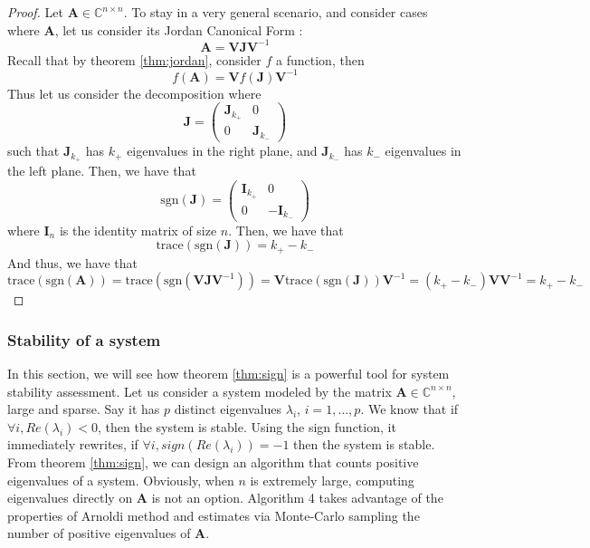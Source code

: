 \documentclass[11pt]{article}
\numberwithin{equation}{section}
\begin{document}
\begin{proof}
    Let $\mathbf{A}\in\mathbb{C}^{n\times n}$. To stay in a very general scenario, and consider cases where $\mathbf{A}$, let us consider its Jordan Canonical Form :
    \begin{equation*}
        \mathbf{A} = \mathbf{VJV}^{-1}
    \end{equation*} 
    Recall that by theorem \ref{thm:jordan}, consider $f$ a function, then 
    \begin{equation*}
        f(\mathbf{A}) = \mathbf{V}f(\mathbf{J})\mathbf{V}^{-1}
    \end{equation*}
    Thus let us consider the decomposition where 
    \begin{equation*}
        \mathbf{J} = \begin{pmatrix}
            \mathbf{J}_{k_+} & 0 \\ 0 & \mathbf{J}_{k_-}
        \end{pmatrix}
    \end{equation*}
    such that $\mathbf{J}_{k_+}$ has $k_+$ eigenvalues in the right plane, and $\mathbf{J}_{k_-}$ has $k_-$ eigenvalues in the left plane. Then, we have that
    \begin{equation*}
        \text{sgn}(\mathbf{J}) = \begin{pmatrix}
            \mathbf{I}_{k_+} & 0 \\ 0 & -\mathbf{I}_{k_-}
        \end{pmatrix}
    \end{equation*}
    where $\mathbf{I}_n$ is the identity matrix of size $n$. Then, we have that
    \begin{equation*}
        \text{trace}(\text{sgn}(\mathbf{J})) = k_+ - k_-
    \end{equation*}
    And thus, we have that
    \begin{equation*}
        \text{trace}(\text{sgn}(\mathbf{A})) = \text{trace}(\text{sgn}(\mathbf{VJV}^{-1})) = \mathbf{V}\text{trace}(\text{sgn}(\mathbf{J}))\mathbf{V}^{-1} = (k_+-k_-)\mathbf{V}\mathbf{V}^{-1} = k_+ - k_-
    \end{equation*}
\end{proof}
\subsubsection{Stability of a system}
In this section, we will see how theorem \ref{thm:sign} is a powerful tool for system stability assessment. Let us consider a system modeled by the matrix $\mathbf{A}\in\mathbb{C}^{n\times n}$, large and sparse. Say it has $p$ distinct eigenvalues $\lambda_i$, $i=1,\dots,p$. We know that if $\forall i, Re(\lambda_i)<0$, then the system is stable. Using the sign function, it immediately rewrites, if $\forall i, sign(Re(\lambda_i)) = -1$ then the system is stable. From theorem \ref{thm:sign}, we can design an algorithm that counts positive eigenvalues of a system. Obviously, when $n$ is extremely large, computing eigenvalues directly on $\mathbf{A}$ is not an option. Algorithm 4 takes advantage of the properties of Arnoldi method and estimates via Monte-Carlo sampling the number of positive eigenvalues of $\mathbf{A}$.
\end{document}
